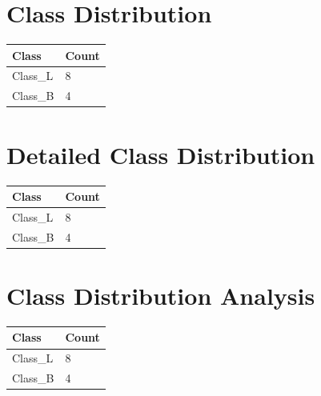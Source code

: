 \documentclass[twocolumn]{svjour3}
\begin{document}
\section{Class Distribution}
\begin{tabular}{l}
\hline
Class & Count \\
\hline
Class\_L & 8 \\
Class\_B & 4 \\
\hline
\end{tabular}
\section{Detailed Class Distribution}
\begin{tabular}{l}
\hline
Class & Count \\
\hline
Class\_L & 8 \\
Class\_B & 4 \\
\hline
\end{tabular}
\section{Class Distribution Analysis}
\begin{tabular}{l}
\hline
Class & Count \\
\hline
Class\_L & 8 \\
Class\_B & 4 \\
\hline
\end{tabular}
\end{document}
